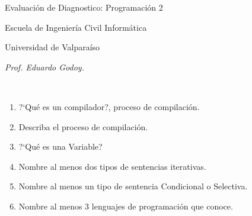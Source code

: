 \documentclass{article}
\begin{document}
	\centerline{\sc \large Evaluaci\'on de Diagnostico: Programaci\'on 2}
	\centerline{\sc \normalsize Escuela de Ingenier\'ia Civil Inform\'atica}
	\centerline{\sc \normalsize  Universidad de Valpara\'iso}
 \centerline\emph{\small Prof. Eduardo Godoy.} \\

	\vspace{1pc}

	\begin{enumerate}
		\item  ?`Qu\'e es un compilador?, proceso de compilaci\'on.
		\item Describa el proceso de compilaci\'on.
		\item ?`Qu\'e es una Variable?
		\item Nombre al menos dos tipos de sentencias iterativas.
		\item Nombre al menos un tipo de sentencia Condicional o Selectiva.
		\item Nombre al menos 3 lenguajes de programaci\'on que conoce. 
\end{enumerate}
\end{document}
